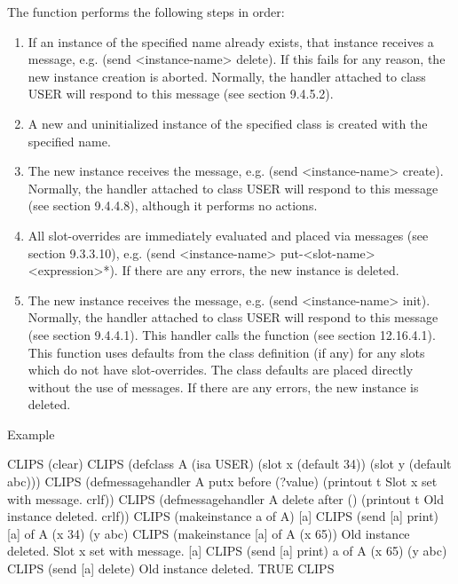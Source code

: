 \documentclass[letterpaper,10pt,english]{sphinxmanual}
\begin{document}
The  function performs the following steps in order:
\begin{enumerate}
\def\theenumi{\arabic{enumi}}
\def\labelenumi{\theenumi .}
\makeatletter\def\p@enumii{\p@enumi \theenumi .}\makeatother
\item {} 
If an instance of the specified name already exists, that instance
receives a  message, e.g. (send \textless{}instance-name\textgreater{} delete). If
this fails for any reason, the new instance creation is aborted.
Normally, the handler attached to class USER will respond to this
message (see section 9.4.5.2).

\item {} 
A new and uninitialized instance of the specified class is created
with the specified name.

\item {} 
The new instance receives the  message, e.g. (send
\textless{}instance-name\textgreater{} create). Normally, the handler attached to class USER
will respond to this message (see section 9.4.4.8), although it
performs no actions.

\item {} 
All slot-overrides are immediately evaluated and placed via 
messages (see section 9.3.3.10), e.g. (send \textless{}instance-name\textgreater{}
put-\textless{}slot-name\textgreater{} \textless{}expression\textgreater{}*). If there are any errors, the new
instance is deleted.

\item {} 
The new instance receives the  message, e.g. (send
\textless{}instance-name\textgreater{} init). Normally, the handler attached to class USER will
respond to this message (see section 9.4.4.1). This handler calls the
 function (see section 12.16.4.1). This function uses
defaults from the class definition (if any) for any slots which do not
have slot-overrides. The class defaults are placed directly without the
use of messages. If there are any errors, the new instance is deleted.

\end{enumerate}

Example

\begin{sphinxVerbatim}[commandchars=\\\{\}]
CLIPS\PYGZgt{} (clear)
CLIPS\PYGZgt{}
(defclass A (is\PYGZhy{}a USER)
  (slot x (default 34))
  (slot y (default abc)))
CLIPS\PYGZgt{}
(defmessage\PYGZhy{}handler A put\PYGZhy{}x before (?value)
  (printout t \PYGZdq{}Slot x set with message.\PYGZdq{} crlf))
CLIPS\PYGZgt{}
(defmessage\PYGZhy{}handler A delete after ()
  (printout t \PYGZdq{}Old instance deleted.\PYGZdq{} crlf))
CLIPS\PYGZgt{} (make\PYGZhy{}instance a of A)
[a]
CLIPS\PYGZgt{} (send [a] print)
[a] of A
(x 34)
(y abc)
CLIPS\PYGZgt{} (make\PYGZhy{}instance [a] of A (x 65))
Old instance deleted.
Slot x set with message.
[a]
CLIPS\PYGZgt{} (send [a] print)
a of A
(x 65)
(y abc)
CLIPS\PYGZgt{} (send [a] delete)
Old instance deleted.
TRUE
CLIPS\PYGZgt{}
\end{sphinxVerbatim}
\end{document}
